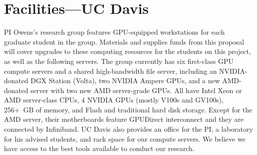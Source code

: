 \newcommand{\acro}[1]{{#1}}

\section*{Facilities---UC Davis}

\acro{PI} Owens's research group features \acro{GPU}-equipped workstations for each graduate student in the group. Materials and supplies funds from this proposal will cover upgrades to these computing resources for the students on this project, as well as the following servers. The group currently has six first-class \acro{GPU} compute servers and a shared high-bandwidth file server, including an \acro{NVIDIA}-donated \acro{DGX} Station (Volta), two \acro{NVIDIA} Ampere \acro{GPU}s, and a new \acro{AMD}-donated server with two new \acro{AMD} server-grade \acro{GPU}s. All have Intel Xeon or \acro{AMD} server-class \acro{CPU}s, 4 \acro{NVIDIA} \acro{GPU}s (mostly \acro{V}100s and \acro{GV}100s), 256+~\acro{GB} of memory, and Flash and traditional hard disk storage. Except for the \acro{AMD} server, their motherboards feature \acro{GPUD}irect interconnect and they are connected by Infiniband. \acro{UC} Davis also provides an office for the \acro{PI}, a laboratory for his advised students, and rack space for our compute servers. We believe we have access to the best tools available to conduct our research.

